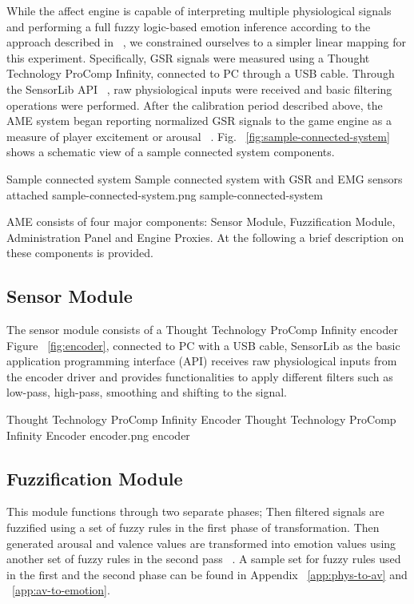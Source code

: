 While the affect engine is capable of interpreting multiple physiological signals and performing a full fuzzy logic-based emotion inference according to the approach described in ~\cite{mandryk2007fuzzy}, we constrained ourselves to a simpler linear mapping for this experiment. Specifically, GSR signals were measured using a Thought Technology ProComp Infinity, connected to PC through a USB cable. Through the SensorLib API ~\cite{nacke2011biofeedback}, raw physiological inputs were received and basic filtering operations were performed. After the calibration period described above, the AME system began reporting normalized GSR signals to the game engine as a measure of player excitement or arousal ~\cite{aggag2011affective, tijs2009creating}. Fig. ~\ref{fig:sample-connected-system} shows a schematic view of a sample connected system components.

\img
{Sample connected system}
{Sample connected system with GSR and EMG sensors attached}
{sample-connected-system.png}
{sample-connected-system}

AME consists of four major components: Sensor Module, Fuzzification Module, Administration Panel and Engine Proxies. At the following a brief description on these components is provided.

\subsection{Sensor Module} %
The sensor module consists of a Thought Technology ProComp Infinity encoder ~\cite{tt2013procomp} Figure ~\ref{fig:encoder}, connected to PC with a USB cable, SensorLib as the basic application programming interface (API) receives raw physiological inputs from the encoder driver and provides functionalities to apply different filters such as low-pass, high-pass, smoothing and shifting to the signal.

\img
{Thought Technology ProComp Infinity Encoder}
{Thought Technology ProComp Infinity Encoder}
{encoder.png}
{encoder}

\subsection{Fuzzification Module} \label{subsec:fuzzi} %
This module functions through two separate phases; Then filtered signals are fuzzified using a set of fuzzy rules in the first phase of transformation. Then generated arousal and valence values are transformed into emotion values using another set of fuzzy rules in the second pass ~\cite{mandryk2007fuzzy}. A sample set for fuzzy rules used in the first and the second phase can be found in Appendix ~\ref{app:phys-to-av} and ~\ref{app:av-to-emotion}.

